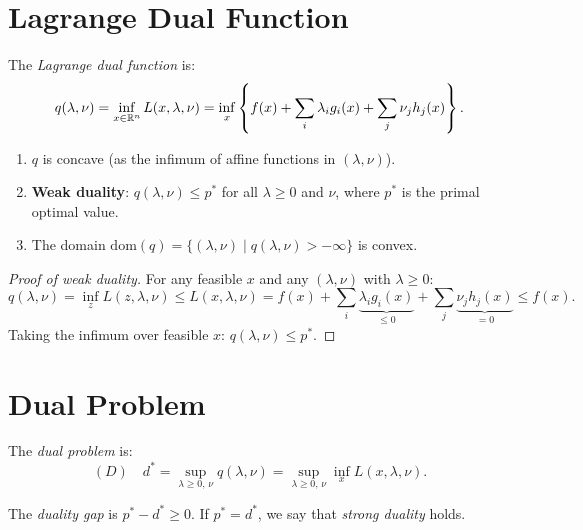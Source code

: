 \section{Lagrange Dual Function}

\begin{definition}
The \emph{Lagrange dual function} is:
\[
    q(\lambda, \nu) = \inf_{x \in \mathbb{R}^n} L(x, \lambda, \nu)
    = \inf_x \left\{f(x) + \sum_i \lambda_i g_i(x) + \sum_j \nu_j h_j(x)\right\}.
\]
\end{definition}

\begin{theorem}
\label{thm:dual}
\begin{enumerate}
    \item $q$ is concave (as the infimum of affine functions in $(\lambda, \nu)$).
    \item \textbf{Weak duality}: $q(\lambda, \nu) \leq p^*$ for all $\lambda \geq 0$
    and $\nu$, where $p^*$ is the primal optimal value.
    \item The domain $\mathrm{dom}(q) = \{(\lambda,\nu) \mid q(\lambda,\nu) > -\infty\}$
    is convex.
\end{enumerate}
\end{theorem}

\begin{proof}[Proof of weak duality]
For any feasible $x$ and any $(\lambda, \nu)$ with $\lambda \geq 0$:
\[
    q(\lambda, \nu) = \inf_{z} L(z, \lambda, \nu) \leq L(x, \lambda, \nu)
    = f(x) + \sum_i \underbrace{\lambda_i g_i(x)}_{\leq 0}
    + \sum_j \underbrace{\nu_j h_j(x)}_{= 0} \leq f(x).
\]
Taking the infimum over feasible $x$: $q(\lambda, \nu) \leq p^*$.
\end{proof}

\section{Dual Problem}

\begin{definition}
The \emph{dual problem} is:
\[
    (D) \quad d^* = \sup_{\lambda \geq 0, \, \nu} q(\lambda, \nu)
    = \sup_{\lambda \geq 0, \, \nu} \inf_x L(x, \lambda, \nu).
\]
\end{definition}

\begin{definition}
The \emph{duality gap} is $p^* - d^* \geq 0$. If $p^* = d^*$, we say that
\emph{strong duality} holds.
\end{definition}


